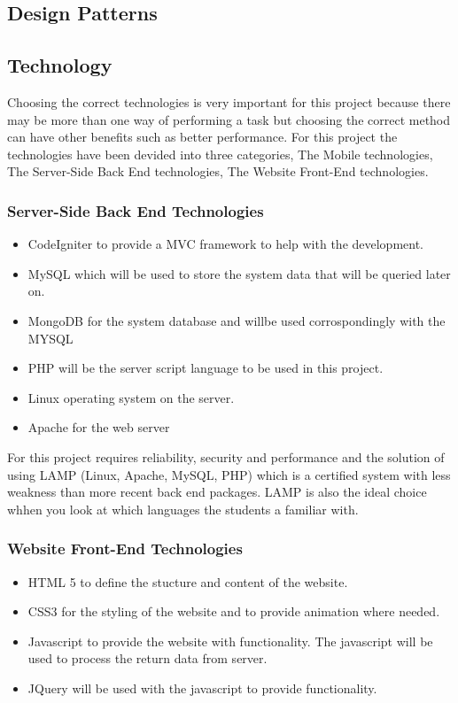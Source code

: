 \documentclass[a4paper,12pt]{report}
\begin{document}
	\newpage

\newpage
\subsection{Design Patterns}
\newpage
\subsection{Technology}
Choosing the correct technologies is very important for this project because there may be  more than one way of performing a task but choosing the correct method can have other benefits such as better performance.
For this project the technologies have been devided into three categories, The Mobile technologies, The Server-Side Back End technologies, The Website Front-End technologies.
\subsubsection{Server-Side Back End Technologies}
\begin{itemize}
	\item CodeIgniter to provide a MVC framework to help with the development.
	\item MySQL which will be used to store the system data that will be queried later on.
	\item MongoDB for the system database and willbe used corrospondingly with the MYSQL
	\item PHP will be the server script language to be used in this project.
	\item Linux operating system on the server.
	\item Apache for the web server 
\end{itemize}
For this project requires reliability, security and performance and the solution of using LAMP (Linux, Apache, MySQL, PHP) which is a certified system with less weakness than more recent back end packages. LAMP  is also the ideal choice whhen you look at which languages the students a familiar with.
\subsubsection{Website Front-End Technologies}
\begin{itemize}
	\item HTML 5 to define the stucture and content of the website.
	\item CSS3 for the styling of the website and to provide animation where needed.
	\item Javascript to provide the website with functionality. The javascript will be used to process the return data from server.
	\item JQuery will be used with the javascript to provide functionality.
\end{itemize}
\end{document}
